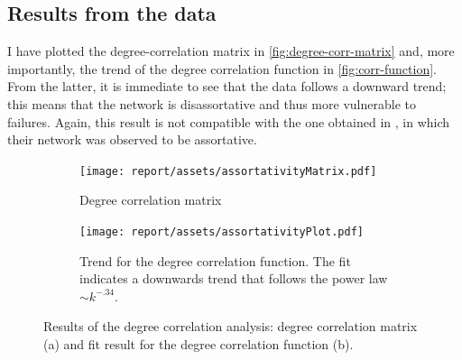 \subsection{Results from the data}
I have plotted the degree-correlation matrix in \autoref{fig:degree-corr-matrix} and, more importantly, the trend of the degree correlation function in \autoref{fig:corr-function}. From the latter, it is immediate to see that the data follows a downward trend; this means that the network is disassortative and thus more vulnerable to failures. Again, this result is not compatible with the one obtained in \cite{gamma4}, in which their network was observed to be assortative.

\begin{figure}[h]
    \centering
    \begin{subfigure}[h]{\linewidth}
        \centering
        \texttt{[image: report/assets/assortativityMatrix.pdf]}
        \caption{Degree correlation matrix}
        \label{fig:degree-corr-matrix}
    \end{subfigure}
    \hfill
    \begin{subfigure}[h]{\linewidth}
        \centering
        \texttt{[image: report/assets/assortativityPlot.pdf]}
        \caption{Trend for the degree correlation function. The fit indicates a downwards trend that follows the power law $\sim k^{-.34}$.}
        \label{fig:corr-function}
    \end{subfigure}
        \caption{Results of the degree correlation analysis: degree correlation matrix (a) and fit result for the degree correlation function (b).}
    \label{fig:assortativity}
\end{figure}